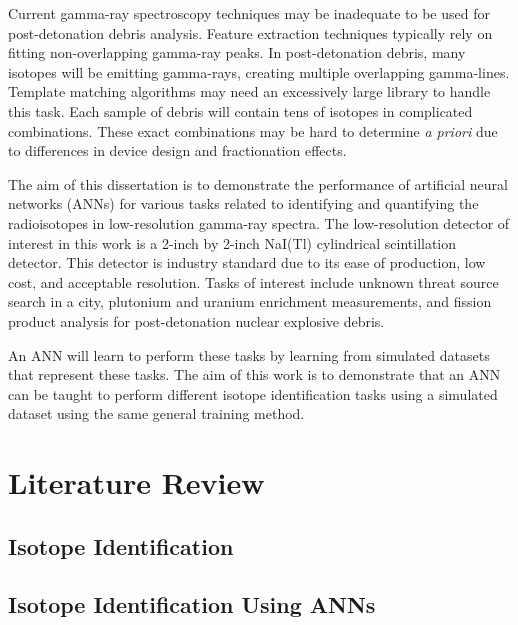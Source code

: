 \documentclass[thesis,tocnosub,noragright,centerchapter,12pt,fullpage]{uiucecethesis09}
\begin{document}
Current gamma-ray spectroscopy techniques may be inadequate to be used for post-detonation debris analysis. Feature extraction techniques typically rely on fitting non-overlapping gamma-ray peaks. In post-detonation debris, many isotopes will be emitting gamma-rays, creating multiple overlapping gamma-lines. Template matching algorithms may need an excessively large library to handle this task. Each sample of debris will contain tens of isotopes in complicated combinations. These exact combinations may be hard to determine  \textit{a priori} due to differences in device design and fractionation effects. 








The aim of this dissertation is to demonstrate the performance of artificial neural networks (ANNs) for various tasks related to identifying and quantifying the radioisotopes in low-resolution gamma-ray spectra. The low-resolution detector of interest in this work is a 2-inch by 2-inch NaI(Tl) cylindrical scintillation detector. This detector is industry standard due to its ease of production, low cost, and acceptable resolution. Tasks of interest include unknown threat source search in a city, plutonium and uranium enrichment measurements, and fission product analysis for post-detonation nuclear explosive debris. 

An ANN will learn to perform these tasks by learning from simulated datasets that represent these tasks. The aim of this work is to demonstrate that an ANN can be taught to perform different isotope identification tasks using a simulated dataset using the same general training method.









\chapter{Literature Review}


\section{Isotope Identification}




\section{Isotope Identification Using ANNs}
\end{document}

